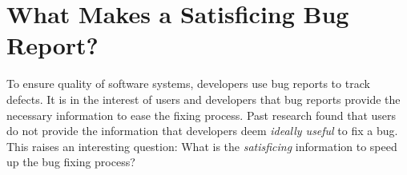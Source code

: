 

\newcommand{\keywords}[1]{\par\addvspace\baselineskip
\noindent\keywordname\enspace\ignorespaces#1}


\newlength\Linewidth
\def\findlength{\setlength\Linewidth\linewidth
\addtolength\Linewidth{-4\fboxrule}
\addtolength\Linewidth{-3\fboxsep}
}
\newenvironment{examplebox}{\par\begingroup
   \setlength{\fboxsep}{5pt}\findlength
   \setbox0=\vbox\bgroup\noindent
   \hsize=0.95\linewidth
   \begin{minipage}{0.95\linewidth}\normalsize}
    {\end{minipage}\egroup
    \textcolor{gray20}{\fboxsep1.5pt\fbox
     {\fboxsep5pt\colorbox{gray05}{\normalcolor\box0}}}
    \endgroup\par\noindent
    \normalcolor\ignorespacesafterend}
\let\Examplebox\examplebox
\let\endExamplebox\endexamplebox

%

%

\newcommand{\RQ}[2]{%
\refstepcounter{RQCounter} \label{#1}
 \begin{center}
  \begin{examplebox}
   \textbf{RQ\arabic{RQCounter}.}~#2
  \end{examplebox}
 \end{center}
}


\chapter{What Makes a Satisficing Bug Report?}\label{ch:model}

To ensure quality of software systems, developers use bug reports to track defects.
It is in the interest of users and developers that bug reports provide the necessary information to ease the fixing process.
Past research found that users do not provide the information that developers deem \emph{ideally useful} to fix a bug.
This raises an interesting question: What is the \emph{satisficing} information to speed up the bug fixing process?

